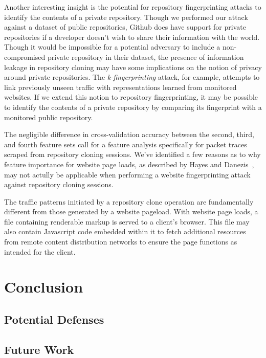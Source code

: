 \documentclass[sigconf,authorversion,nonacm]{acmart}
\begin{document}
Another interesting insight is the potential for repository fingerprinting attacks to identify the contents of a private repository. Though we performed our attack against a dataset of public repositories, Github does have support for private repositories if a developer doesn't wish to share their information with the world. Though it would be impossible for a potential adversary to include a non-compromised private repository in their dataset, the presence of information leakage in repository cloning may have some implications on the notion of privacy around private repositories. The \textit{k-fingerprinting} attack, for example, attempts to link previously unseen traffic with representations learned from monitored websites. If we extend this notion to repository fingerprinting, it may be possible to identify the contents of a private repository by comparing its fingerprint with a monitored public repository.

The negligible difference in cross-validation accuracy between the second, third, and fourth feature sets call for a feature analysis specifically for packet traces scraped from repository cloning sessions. We've identified a few reasons as to why feature importance for website page loads, as described by Hayes and Danezis~\citep{hayes2016k}, may not actully be applicable when performing a website fingerprinting attack against repository cloning sessions.

The traffic patterns initiated by a repository clone operation are fundamentally different from those generated by a website pageload. With website page loads, a file containing renderable markup is served to a client's browser. This file may also contain Javascript code embedded within it to fetch additional resources from remote content distribution networks to ensure the page functions as intended for the client. 



\section{Conclusion}




\subsection{Potential Defenses}

\subsection{Future Work}
\end{document}
